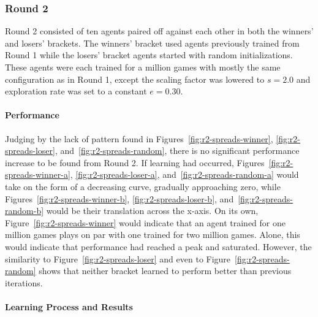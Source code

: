 
\subsubsection*{Round 2}
\label{sec:findings-r2}

Round 2 consisted of ten agents paired off against each other
in both the winners' and losers' brackets.
%
The winners' bracket used agents previously trained from Round 1
while the losers' bracket agents started with random initializations.
%
These agents were each trained for a million games
with mostly the same configuration as in Round 1,
except the scaling factor was lowered to $s = 2.0$
and exploration rate was set to a constant $e = 0.30$.

\paragraph*{Performance}
\label{sec:findings-r2-perf}

Judging by the lack of pattern found in
Figures~\ref{fig:r2-spreads-winner},
\ref{fig:r2-spreads-loser},
and~\ref{fig:r2-spreads-random},
there is no significant performance increase to be found from Round 2.
%
If learning had occurred,
Figures~\ref{fig:r2-spreads-winner-a},
\ref{fig:r2-spreads-loser-a},
and~\ref{fig:r2-spreads-random-a}
would take on the form of a decreasing curve,
gradually approaching zero,
while Figures~\ref{fig:r2-spreads-winner-b},
\ref{fig:r2-spreads-loser-b},
and~\ref{fig:r2-spreads-random-b}
would be their translation across the x-axis.
%
On its own, Figure~\ref{fig:r2-spreads-winner}
would indicate that an agent trained for one million games plays on par with
one trained for two million games.
%
Alone,
this would indicate that performance had reached a peak and saturated.
%
However,
the similarity to Figure~\ref{fig:r2-spreads-loser}
and even to Figure~\ref{fig:r2-spreads-random}
shows that neither bracket learned to perform better than previous iterations.









\paragraph*{Learning Process and Results}
\label{sec:findings-r2-results}

